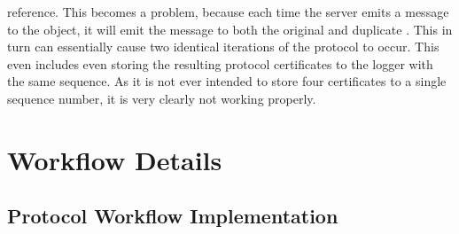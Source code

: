 reference. This becomes a problem, because each time the server emits a message to the  object, it will emit the message to both the original and duplicate . This in turn can essentially cause two identical iterations of the protocol to occur. This even includes even storing the resulting protocol certificates to the logger with the same sequence. As it is not ever intended to store four certificates to a single sequence number, it is very clearly not working properly. 
\fi

\section{Workflow Details}
\label{sec:protocolwork}
\subsection{Protocol Workflow Implementation}

